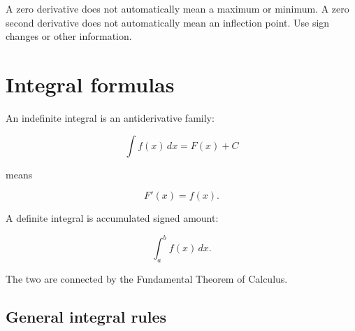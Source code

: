 A zero derivative does not automatically mean a maximum or minimum.  A zero second
derivative does not automatically mean an inflection point.  Use sign changes or other
information.

\section{Integral formulas}
\label{appsec:integral-formulas}

An indefinite integral is an antiderivative family:

\[
\int f(x)\,dx=F(x)+C
\]

means

\[
F'(x)=f(x).
\]

A definite integral is accumulated signed amount:

\[
\int_a^b f(x)\,dx.
\]

The two are connected by the Fundamental Theorem of Calculus.

\subsection{General integral rules}
\label{appsubsec:general-integral-rules}

